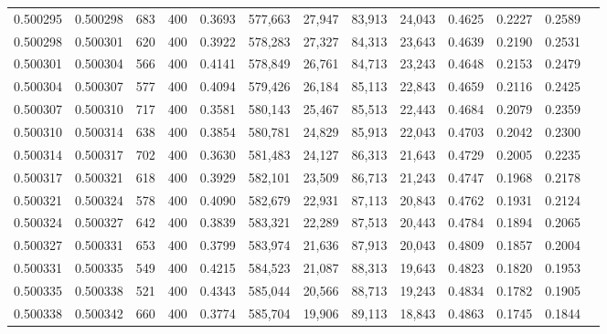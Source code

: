 \begin{tabular}{rrrrrrrrrrrrr}
0.500295 & 0.500298 &    683 & 400 &                                     0.3693 & 577,663 &  27,947 &  83,913 &  24,043 & 0.4625 & 0.2227 & 0.2589 \\
0.500298 & 0.500301 &    620 & 400 &                                     0.3922 & 578,283 &  27,327 &  84,313 &  23,643 & 0.4639 & 0.2190 & 0.2531 \\
0.500301 & 0.500304 &    566 & 400 &                                     0.4141 & 578,849 &  26,761 &  84,713 &  23,243 & 0.4648 & 0.2153 & 0.2479 \\
0.500304 & 0.500307 &    577 & 400 &                                     0.4094 & 579,426 &  26,184 &  85,113 &  22,843 & 0.4659 & 0.2116 & 0.2425 \\
0.500307 & 0.500310 &    717 & 400 &                                     0.3581 & 580,143 &  25,467 &  85,513 &  22,443 & 0.4684 & 0.2079 & 0.2359 \\
0.500310 & 0.500314 &    638 & 400 &                                     0.3854 & 580,781 &  24,829 &  85,913 &  22,043 & 0.4703 & 0.2042 & 0.2300 \\
0.500314 & 0.500317 &    702 & 400 &                                     0.3630 & 581,483 &  24,127 &  86,313 &  21,643 & 0.4729 & 0.2005 & 0.2235 \\
0.500317 & 0.500321 &    618 & 400 &                                     0.3929 & 582,101 &  23,509 &  86,713 &  21,243 & 0.4747 & 0.1968 & 0.2178 \\
0.500321 & 0.500324 &    578 & 400 &                                     0.4090 & 582,679 &  22,931 &  87,113 &  20,843 & 0.4762 & 0.1931 & 0.2124 \\
0.500324 & 0.500327 &    642 & 400 &                                     0.3839 & 583,321 &  22,289 &  87,513 &  20,443 & 0.4784 & 0.1894 & 0.2065 \\
0.500327 & 0.500331 &    653 & 400 &                                     0.3799 & 583,974 &  21,636 &  87,913 &  20,043 & 0.4809 & 0.1857 & 0.2004 \\
0.500331 & 0.500335 &    549 & 400 &                                     0.4215 & 584,523 &  21,087 &  88,313 &  19,643 & 0.4823 & 0.1820 & 0.1953 \\
0.500335 & 0.500338 &    521 & 400 &                                     0.4343 & 585,044 &  20,566 &  88,713 &  19,243 & 0.4834 & 0.1782 & 0.1905 \\
0.500338 & 0.500342 &    660 & 400 &                                     0.3774 & 585,704 &  19,906 &  89,113 &  18,843 & 0.4863 & 0.1745 & 0.1844 \\

\end{tabular}
